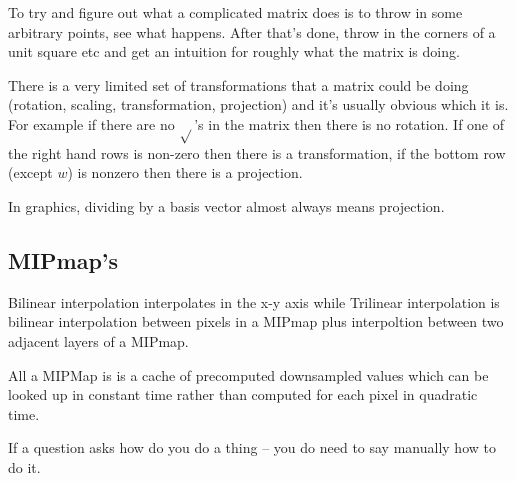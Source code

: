 \documentclass[10pt, a4paper]{article}
\begin{document}
To try and figure out what a complicated matrix does is to throw in some
arbitrary points, see what happens. After that's done, throw in the
corners of a unit square etc and get an intuition for roughly what the matrix is doing.

There is a very limited set of transformations that a matrix could be doing
(rotation, scaling, transformation, projection)
and it's usually obvious which it is. For example if there are no $\sqrt{}$'s
in the matrix then there is no rotation. If one of the right hand rows is non-zero then
there is a transformation, if the bottom row (except $w$) is nonzero then there is a
projection.

In graphics, dividing by a basis vector almost always means projection.

\subsection*{MIPmap's}

Bilinear interpolation interpolates in the x-y axis while Trilinear interpolation
is bilinear interpolation between pixels in a MIPmap plus interpoltion between
two adjacent layers of a MIPmap.

All a MIPMap is is a cache of precomputed downsampled values which can be looked up in
constant time rather than computed for each pixel in quadratic time.

If a question asks how do you do a thing -- you do need to say manually how to do it.
\end{document}
